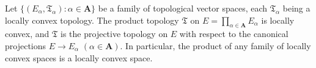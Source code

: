 Let $\{(E_\alpha, \mathfrak{T}_\alpha): \alpha \in \mathbf{A}\}$ be a family of topological vector spaces, each $\mathfrak{T}_\alpha$ being a locally convex topology. The product topology $\mathfrak{T}$ on $E = \prod_{\alpha \in \mathbf{A}} E_\alpha$ is locally convex, and $\mathfrak{T}$ is the projective topology on $E$ with respect to the canonical projections $E \to E_\alpha$ $(\alpha \in \mathbf{A})$. In particular, the product of any family of locally convex spaces is a locally convex space.
